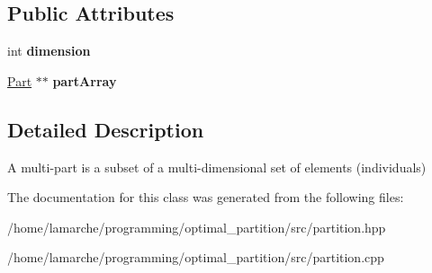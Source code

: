 \subsection*{Public Attributes}
\begin{DoxyCompactItemize}
\item 
\hypertarget{classMultiPart_a9ec48eb39e06eff6209d36db3f39219e}{int {\bfseries dimension}}\label{classMultiPart_a9ec48eb39e06eff6209d36db3f39219e}

\item 
\hypertarget{classMultiPart_a4d526314b79359136dc2c596c0615543}{\hyperlink{classPart}{Part} $\ast$$\ast$ {\bfseries part\-Array}}\label{classMultiPart_a4d526314b79359136dc2c596c0615543}

\end{DoxyCompactItemize}


\subsection{Detailed Description}
A multi-\/part is a subset of a multi-\/dimensional set of elements (individuals) 

The documentation for this class was generated from the following files\-:\begin{DoxyCompactItemize}
\item 
/home/lamarche/programming/optimal\-\_\-partition/src/partition.\-hpp\item 
/home/lamarche/programming/optimal\-\_\-partition/src/partition.\-cpp\end{DoxyCompactItemize}
